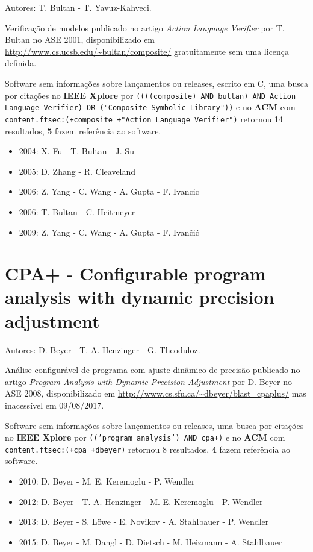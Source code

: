 Autores:
T. Bultan - T. Yavuz-Kahveci.

Verificação de modelos
publicado no artigo {\it Action Language Verifier}
por T. Bultan
no ASE 2001,
disponibilizado em \url{http://www.cs.ucsb.edu/~bultan/composite/}
gratuitamente
sem uma licença definida.

Software sem informações sobre lançamentos ou releases,
escrito em C,
uma busca por citações no {\bf IEEE Xplore} por
\texttt{((((composite) AND bultan) AND Action Language Verifier) OR ("Composite Symbolic Library"))}
e no {\bf ACM} com
\texttt{content.ftsec:(+composite +"Action Language Verifier")}
retornou
14 resultados,
{\bf 5} fazem referência ao software.

\begin{itemize}
\item 2004: X. Fu - T. Bultan - J. Su
\item 2005: D. Zhang - R. Cleaveland
\item 2006: Z. Yang - C. Wang - A. Gupta - F. Ivancic
\item 2006: T. Bultan - C. Heitmeyer
\item 2009: Z. Yang - C. Wang - A. Gupta - F. Ivan\v{c}i\'{c}
\end{itemize}

\section{CPA+ - Configurable program analysis with dynamic precision adjustment}

Autores:
D. Beyer - T. A. Henzinger - G. Theoduloz.

Análise configurável de programa com ajuste dinâmico de precisão
publicado no artigo {\it Program Analysis with Dynamic Precision Adjustment}
por D. Beyer
no ASE 2008,
disponibilizado em \url{http://www.cs.sfu.ca/~dbeyer/blast_cpaplus/}
mas inacessível em 09/08/2017.

Software sem informações sobre lançamentos ou releases,
uma busca por citações no {\bf IEEE Xplore} por
\texttt{(('program analysis') AND cpa+)}
e no {\bf ACM} com
\texttt{content.ftsec:(+cpa +dbeyer)}
retornou
8 resultados,
{\bf 4} fazem referência ao software.

\begin{itemize}
\item 2010: D. Beyer - M. E. Keremoglu - P. Wendler
\item 2012: D. Beyer - T. A. Henzinger - M. E. Keremoglu - P. Wendler
\item 2013: D. Beyer - S. L\"{o}we - E. Novikov - A. Stahlbauer - P. Wendler
\item 2015: D. Beyer - M. Dangl - D. Dietsch - M. Heizmann - A. Stahlbauer
\end{itemize}

